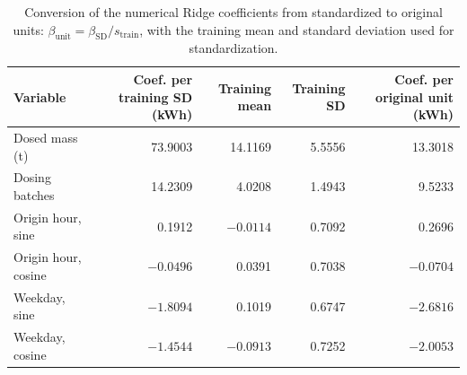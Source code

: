 \begin{table}[!htbp]\centering\small
\caption{Conversion of the numerical Ridge coefficients from standardized to original units: $\beta_{\mathrm{unit}}=\beta_{\mathrm{SD}}/s_{\mathrm{train}}$, with the training mean and standard deviation used for standardization.}\label{tab:s_effects}
\begin{tabular}{@{}lrrrr@{}}\toprule
Variable & Coef. per training SD (kWh) & Training mean & Training SD & Coef. per original unit (kWh) \\\midrule
Dosed mass (t) & 73.9003 & 14.1169 & 5.5556 & 13.3018 \\
Dosing batches & 14.2309 & 4.0208 & 1.4943 & 9.5233 \\
Origin hour, sine & 0.1912 & $-0.0114$ & 0.7092 & 0.2696 \\
Origin hour, cosine & $-0.0496$ & 0.0391 & 0.7038 & $-0.0704$ \\
Weekday, sine & $-1.8094$ & 0.1019 & 0.6747 & $-2.6816$ \\
Weekday, cosine & $-1.4544$ & $-0.0913$ & 0.7252 & $-2.0053$ \\
\bottomrule
\end{tabular}
\end{table}
